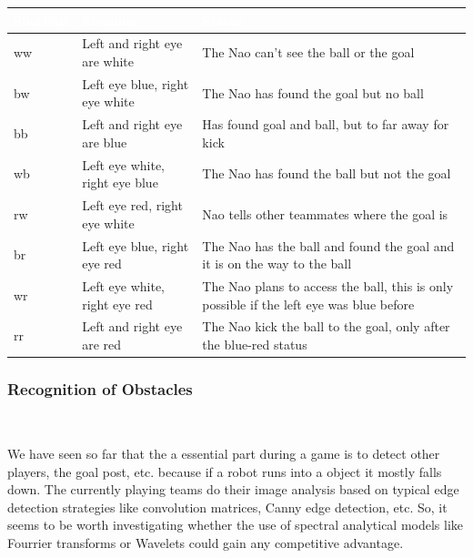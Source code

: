 \documentclass[12pt]{article}
\theoremstyle{definition}
\newcommand{\unclear}[1]{\vspace{.5em}\parbox{.9\linewidth}{\color{red}{\bf Remark: #1}}\vspace{.5em}}
\begin{document}
\begin{tabular}{|p{.21\linewidth}|p{.3\linewidth}|p{.38\linewidth}|}
\hline
\cellcolor[gray]{0.5}\textcolor{white}{Shortcut} & \cellcolor[gray]{0.45}\textcolor{white}{Meaning} & \cellcolor[gray]{0.5}\textcolor{white}{Status}\\ \hline
ww&Left and right eye are white&The Nao can't see the ball or the goal\\ \hline
bw&Left eye blue, right eye white&The Nao has found the goal but no ball \\ \hline
bb&Left and right eye are blue&Has found goal and ball, but to far away for kick \\ \hline
wb&Left eye white, right eye blue&The Nao has found the ball but not the goal\\ \hline 
rw&Left eye red, right eye white&Nao tells other teammates where the goal is \\ \hline
br&Left eye blue, right eye red&The Nao has the ball and found the goal and it is on the way to the ball\\ \hline
wr&Left eye white, right eye red&The Nao plans to access the ball, this is only possible if the left eye was blue before\\ \hline
rr&Left and right eye are red&The Nao kick the ball to the goal, only after the blue-red status\\ \hline
\end{tabular}

\subsubsection{Recognition of Obstacles}
\unclear{Do not know what you want to tell with this paragraph. Concentrate on the question Why? and How to solve?} \\

\unclear{Now we understand what you meant before, it is okay now?}

We have seen so far that the a essential part during a game is to detect other players, the goal post, etc. because if a robot runs into a object it mostly falls down. The currently playing teams do their image analysis based on typical edge detection strategies like convolution matrices, Canny edge detection, etc. So, it seems to be worth investigating whether the use of spectral analytical models like Fourrier transforms or Wavelets could gain any competitive advantage.

\end{document}
